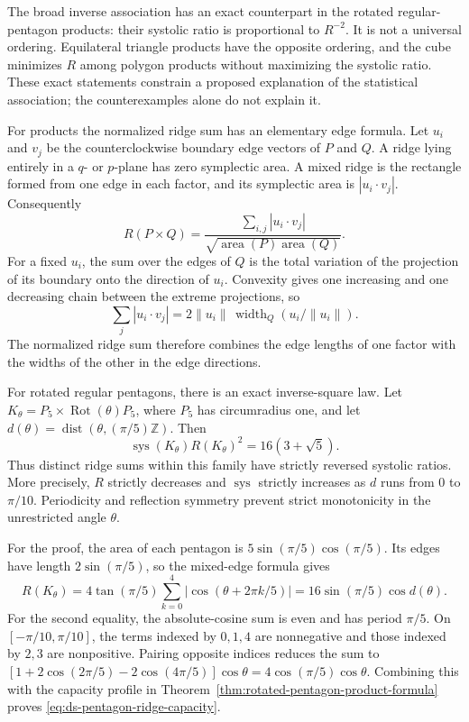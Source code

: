 The broad inverse association has an exact counterpart in the rotated
regular-pentagon products: their systolic ratio is proportional to
$R^{-2}$. It is not a universal ordering. Equilateral triangle products
have the opposite ordering, and the cube minimizes $R$ among polygon
products without maximizing the systolic ratio. These exact statements
constrain a proposed explanation of the statistical association; the
counterexamples alone do not explain it.

For products the normalized ridge sum has an elementary edge formula. Let $u_i$ and $v_j$ be
the counterclockwise boundary edge vectors of $P$ and $Q$. A ridge lying entirely in a $q$-
or $p$-plane has zero symplectic area. A mixed ridge is the rectangle formed
from one edge in each factor, and its symplectic area is $|u_i\cdot v_j|$.
Consequently
\[
 R(P\times Q)=\frac{\sum_{i,j}|u_i\cdot v_j|}
                    {\sqrt{\operatorname{area}(P)\operatorname{area}(Q)}}.
\]
For a fixed $u_i$, the sum over the edges of $Q$ is the total variation of
the projection of its boundary onto the direction of $u_i$. Convexity gives
one increasing and one decreasing chain between the extreme projections,
so
\[
 \sum_j|u_i\cdot v_j|
 =2\|u_i\|\,\operatorname{width}_Q(u_i/\|u_i\|).
\]
The normalized ridge sum therefore combines the edge lengths of one factor with the
widths of the other in the edge directions.


For rotated regular pentagons, there is an exact inverse-square law. Let
$K_\theta=P_5\times\operatorname{Rot}(\theta)P_5$, where $P_5$ has
circumradius one, and let $d(\theta)=\operatorname{dist}(\theta,(\pi/5)\mathbb Z)$.
Then
\begin{equation}\label{eq:ds-pentagon-ridge-capacity}
 \operatorname{sys}(K_\theta)R(K_\theta)^2=16(3+\sqrt5).
\end{equation}
Thus distinct ridge sums within this family have strictly reversed
systolic ratios. More precisely, $R$ strictly decreases and
$\operatorname{sys}$ strictly increases as $d$ runs from $0$ to $\pi/10$.
Periodicity and reflection symmetry prevent strict monotonicity in the
unrestricted angle $\theta$.

For the proof, the area of each pentagon is $5\sin(\pi/5)\cos(\pi/5)$.
Its edges have length $2\sin(\pi/5)$, so the mixed-edge formula gives
\[
 R(K_\theta)=4\tan(\pi/5)\sum_{k=0}^4|\cos(\theta+2\pi k/5)|
           =16\sin(\pi/5)\cos d(\theta).
\]
For the second equality, the absolute-cosine sum is even and has period
$\pi/5$. On $[-\pi/10,\pi/10]$, the terms indexed by $0,1,4$ are
nonnegative and those indexed by $2,3$ are nonpositive. Pairing opposite
indices reduces the sum to
$[1+2\cos(2\pi/5)-2\cos(4\pi/5)]\cos\theta
=4\cos(\pi/5)\cos\theta$. Combining this with the capacity profile in
Theorem~\ref{thm:rotated-pentagon-product-formula} proves
\eqref{eq:ds-pentagon-ridge-capacity}.

